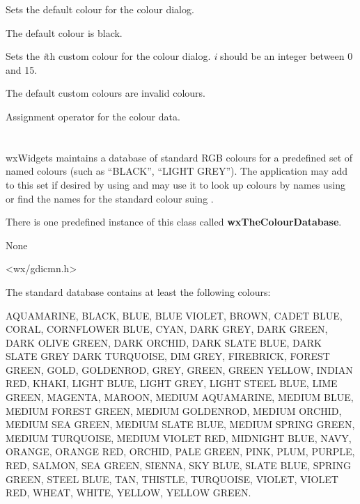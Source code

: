 \label{wxcolourdatasetcolour}


Sets the default colour for the colour dialog.

The default colour is black.


\label{wxcolourdatasetcustomcolour}


Sets the {\it i}th custom colour for the colour dialog. {\it i} should
be an integer between 0 and 15.

The default custom colours are invalid colours.


\label{wxcolourdataassign}


Assignment operator for the colour data.




\section{}\label{wxcolourdatabase}

wxWidgets maintains a database of standard RGB colours for a predefined
set of named colours (such as ``BLACK'', ``LIGHT GREY''). The
application may add to this set if desired by using
 and may use it to look up
colours by names using  or find the names
for the standard colour suing .

There is one predefined instance of this class called
{\bf wxTheColourDatabase}.


None


<wx/gdicmn.h>


The standard database contains at least the following colours:

AQUAMARINE, BLACK, BLUE, BLUE VIOLET, BROWN, CADET BLUE, CORAL,
CORNFLOWER BLUE, CYAN, DARK GREY, DARK GREEN, DARK OLIVE GREEN, DARK
ORCHID, DARK SLATE BLUE, DARK SLATE GREY DARK TURQUOISE, DIM GREY,
FIREBRICK, FOREST GREEN, GOLD, GOLDENROD, GREY, GREEN, GREEN YELLOW,
INDIAN RED, KHAKI, LIGHT BLUE, LIGHT GREY, LIGHT STEEL BLUE, LIME GREEN,
MAGENTA, MAROON, MEDIUM AQUAMARINE, MEDIUM BLUE, MEDIUM FOREST GREEN,
MEDIUM GOLDENROD, MEDIUM ORCHID, MEDIUM SEA GREEN, MEDIUM SLATE BLUE,
MEDIUM SPRING GREEN, MEDIUM TURQUOISE, MEDIUM VIOLET RED, MIDNIGHT BLUE,
NAVY, ORANGE, ORANGE RED, ORCHID, PALE GREEN, PINK, PLUM, PURPLE, RED,
SALMON, SEA GREEN, SIENNA, SKY BLUE, SLATE BLUE, SPRING GREEN, STEEL
BLUE, TAN, THISTLE, TURQUOISE, VIOLET, VIOLET RED, WHEAT, WHITE, YELLOW,
YELLOW GREEN.

